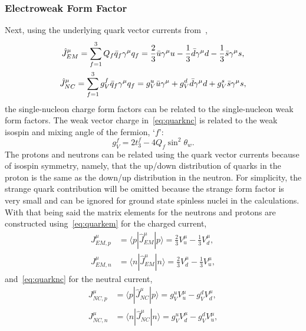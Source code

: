\subsubsection{Electroweak Form Factor}

Next, using the underlying quark vector currents from~\cite{horowitz:2012:impact},
\begin{gather}
\hat{J}_{EM}^{\mu}= \sum _{f=1}^{3} Q_f \bar{q}_f \gamma ^{\mu} q_f =\frac{2}{3}\bar{u}\gamma ^{\mu} u -\frac{1}{3}\bar{d}\gamma ^{\mu} d-\frac{1}{3}\bar{s}\gamma ^{\mu} s, \label{eq:quarkem}  \\
\hat{J}_{NC}^{\mu}= \sum _{f=1}^{3} g_V^f \bar{q}_f \gamma ^{\mu} q_f =g_V^u \bar{u}\gamma ^{\mu} + g_V^d \bar{d}\gamma ^{\mu} d + g_V^s\bar{s}\gamma ^{\mu} s, \label{eq:quarknc}
\end{gather}
the single-nucleon charge form factors can be related to the single-nucleon weak form factors. The weak vector charge in~\eqref{eq:quarknc} is related to the weak isospin and mixing angle of the fermion, `$f$':
\begin{equation}
g_V^f= 2t_3^f - 4 Q_f \sin ^2 \theta _w.
\end{equation}
The protons and neutrons can be related using the quark vector currents because of isospin symmetry, namely, that the up/down distribution of quarks in the proton is the same as the down/up distribution in the neutron. For simplicity, the strange quark contribution will be omitted because the strange form factor is very small and can be ignored for ground state spinless nuclei in the calculations. With that being said the matrix elements for the neutrons and protons  are constructed using~\eqref{eq:quarkem} for the charged current,
\begin{equation}\label{eq:matrixem}
\begin{aligned}
J^{\mu}_{EM,p} &= \langle p|\hat{J}^{\mu}_{EM}|p \rangle = \frac{2}{3} V_u^{\mu} - \frac{1}{3} V_d^{\mu},
\\    
J^{\mu}_{EM,n} &= \langle n|\hat{J}^{\mu}_{EM}|n \rangle = \frac{2}{3} V_d^{\mu} - \frac{1}{3} V_u^{\mu},
\end{aligned}
\end{equation}
and~\eqref{eq:quarknc} for the neutral current,
\begin{equation}\label{eq:matrixnc}
\begin{aligned}
J^{\mu}_{NC,p} &= \langle p|\hat{J}^{\mu}_{NC}|p \rangle = g_V^u V_u^{\mu} - g_V^d V_d^{\mu},
\\    
J^{\mu}_{NC,n} &= \langle n|\hat{J}^{\mu}_{NC}|n \rangle = g_V^u V_d^{\mu} - g_V^d V_u^{\mu},
\end{aligned}
\end{equation}

